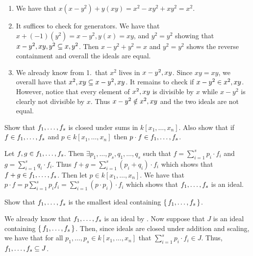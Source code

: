 \documentclass[letterpaper, 11pt, oneside]{book}
\begin{document}
\begin{pf}
  \begin{enumerate}[label= (\alph*)]
    \item We have that $x(x - y^{2}) + y(xy) = x^{2} - xy^{2} + xy^{2} = x^{2}$.
    \item It suffices to check for generators.
          We have that $x + (-1)(y^{2}) = x - y^{2}, y(x) = xy$, and $y^{2} = y^{2}$ showing that $\ideal{x - y^{2}, xy, y^{2}} \subseteq \ideal{x, y^{2}}$.
          Then $x - y^{2} + y^{2} = x$ and $y^{2} = y^{2}$ shows the reverse containment and overall the ideals are equal.
    \item We already know from 1.\ that $x^{2}$ lives in $\ideal{x - y^{2}, xy}$.
          Since $xy = xy$, we overall have that $\ideal{x^{2}, xy} \subseteq \ideal{x - y^{2}, xy}$.
          It remains to check if $x - y^{2} \in \ideal{x^{2}, xy}$.
          However, notice that every element of $\ideal{x^{2}, xy}$ is divisible by $x$ while $x - y^{2}$ is clearly not divisible by $x$.
          Thus $x - y^{2} \notin \ideal{x^{2}, xy}$ and the two ideals are not equal.
  \end{enumerate}
\end{pf}

\clearpage

\begin{exercise}\label{ex:UAG_1.1.2}
  Show that $\ideal{f_{1}, \ldots, f_{s}}$ is closed under sums in $k[x_{1}, \ldots, x_{n}]$.
  Also show that if $f \in \ideal{f_{1}, \ldots, f_{s}}$ and $p \in k[x_{1}, \ldots, x_{n}]$ then $p \cdot f \in \ideal{f_{1}, \ldots, f_{s}}$.
\end{exercise}
\begin{pf}
  Let $f, g \in \ideal{f_{1}, \ldots, f_{s}}$.
  Then $\exists p_{1}, \ldots, p_{s}, q_{1}, \ldots, q_{s}$ such that $f = \sum_{i = 1}^{s} p_{i} \cdot f_{i}$ and $g = \sum_{i = 1}^{s} q_{i} \cdot f_{i}$.
  Thus $f + g = \sum_{i = 1}^{s} (p_{i} + q_{i}) \cdot f_{i}$ which shows that $f + g \in \ideal{f_{1}, \ldots, f_{s}}$.
  Then let $p \in k[x_{1}, \ldots, x_{n}]$.
  We have that $p \cdot f = p\sum_{i = 1}^{s} p_{i} f_{i} = \sum_{i = 1}^{s} (p \cdot p_{i}) \cdot f_{i}$ which shows that $\ideal{f_{1}, \ldots, f_{s}}$ is an ideal.
\end{pf}

\begin{exercise}\label{ex:UAG_1.1.3}
  Show that $\ideal{f_{1}, \ldots, f_{s}}$ is the smallest ideal containing $\set{f_{1}, \ldots, f_{s}}$.
\end{exercise}
\begin{pf}
  We already know that $\ideal{f_{1}, \ldots, f_{s}}$ is an ideal by .
  Now suppose that $J$ is an ideal containing $\set{f_{1}, \ldots, f_{s}}$.
  Then, since ideals are closed under addition and scaling, we have that for all $p_{1}, \ldots, p_{s} \in k[x_{1}, \ldots, x_{n}]$ that $\sum_{i = 1}^{s} p_{i} \cdot f_{i} \in J$.
  Thus, $\ideal{f_{1}, \ldots, f_{s}} \subseteq J$.
\end{pf}
\end{document}
